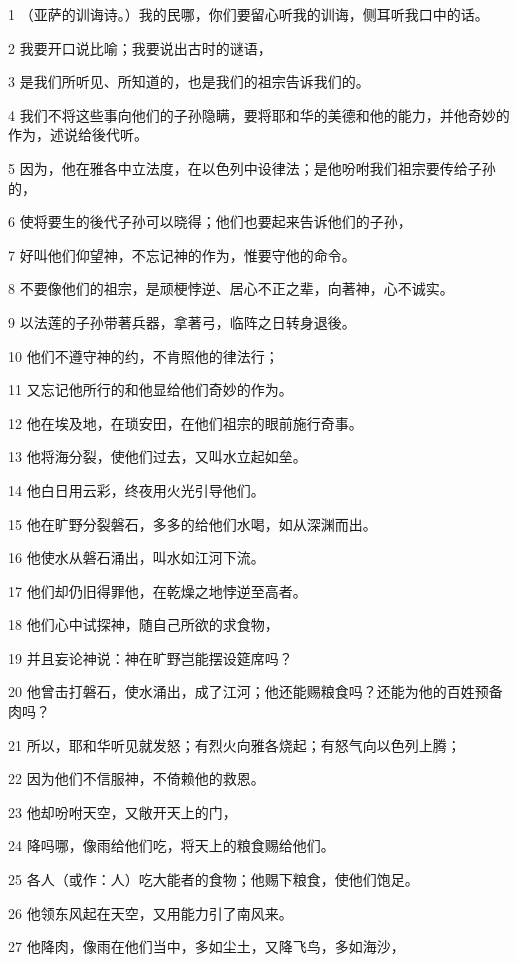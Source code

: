 \par 1 （亚萨的训诲诗。）我的民哪，你们要留心听我的训诲，侧耳听我口中的话。
\par 2 我要开口说比喻；我要说出古时的谜语，
\par 3 是我们所听见、所知道的，也是我们的祖宗告诉我们的。
\par 4 我们不将这些事向他们的子孙隐瞒，要将耶和华的美德和他的能力，并他奇妙的作为，述说给後代听。
\par 5 因为，他在雅各中立法度，在以色列中设律法；是他吩咐我们祖宗要传给子孙的，
\par 6 使将要生的後代子孙可以晓得；他们也要起来告诉他们的子孙，
\par 7 好叫他们仰望神，不忘记神的作为，惟要守他的命令。
\par 8 不要像他们的祖宗，是顽梗悖逆、居心不正之辈，向著神，心不诚实。
\par 9 以法莲的子孙带著兵器，拿著弓，临阵之日转身退後。
\par 10 他们不遵守神的约，不肯照他的律法行；
\par 11 又忘记他所行的和他显给他们奇妙的作为。
\par 12 他在埃及地，在琐安田，在他们祖宗的眼前施行奇事。
\par 13 他将海分裂，使他们过去，又叫水立起如垒。
\par 14 他白日用云彩，终夜用火光引导他们。
\par 15 他在旷野分裂磐石，多多的给他们水喝，如从深渊而出。
\par 16 他使水从磐石涌出，叫水如江河下流。
\par 17 他们却仍旧得罪他，在乾燥之地悖逆至高者。
\par 18 他们心中试探神，随自己所欲的求食物，
\par 19 并且妄论神说：神在旷野岂能摆设筵席吗？
\par 20 他曾击打磐石，使水涌出，成了江河；他还能赐粮食吗？还能为他的百姓预备肉吗？
\par 21 所以，耶和华听见就发怒；有烈火向雅各烧起；有怒气向以色列上腾；
\par 22 因为他们不信服神，不倚赖他的救恩。
\par 23 他却吩咐天空，又敞开天上的门，
\par 24 降吗哪，像雨给他们吃，将天上的粮食赐给他们。
\par 25 各人（或作：人）吃大能者的食物；他赐下粮食，使他们饱足。
\par 26 他领东风起在天空，又用能力引了南风来。
\par 27 他降肉，像雨在他们当中，多如尘土，又降飞鸟，多如海沙，
